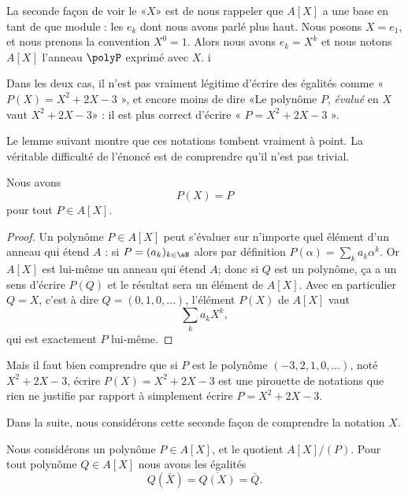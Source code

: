 La seconde façon de voir le «\( X\)» est de nous rappeler que \( A[X]\) a une base en tant de que module : les \( e_k\) dont nous avons parlé plus haut. Nous posons \( X=e_1\), et nous prenons la convention \( X^0=1\). Alors nous avons \( e_k=X^k\) et nous notons \( A[X]\) l'anneau \( \polyP\) exprimé avec \( X\). i

Dans les deux cas, il n'est pas vraiment légitime d'écrire des égalités comme « \( P(X)=X^2+2X-3\) », et encore moins de dire «Le polynôme \( P\), \emph{évalué} en \( X\) vaut \( X^2+2X-3\)»  : il est plus correct d'écrire « \( P=X^2+2X-3\) ».

Le lemme suivant montre que ces notations tombent vraiment à point. La véritable difficulté de l'énoncé est de comprendre qu'il n'est pas trivial.
\begin{lemma}       \label{LEMooGKWQooVOyeDX}
    Nous avons
    \begin{equation}
        P(X)=P
    \end{equation}
    pour tout \( P\in A[X]\).
\end{lemma}

\begin{proof}
    Un polynôme \( P\in A[X]\) peut s'évaluer sur n'importe quel élément d'un anneau qui étend \( A\) : si \( P=(a_k)_{k\in \eN}\) alors par définition \( P(\alpha)=\sum_ka_k\alpha^k\). Or \( A[X]\) est lui-même un anneau qui étend \( A\); donc si \( Q\) est un polynôme, ça a un sens d'écrire \( P(Q)\) et le résultat sera un élément de \( A[X]\). Avec en particulier \( Q=X\), c'est à dire \( Q=(0,1,0,\ldots)\), l'élément \( P(X)\) de \( A[X]\) vaut
    \begin{equation}        \label{EQooABULooFCEasf}
        \sum_ka_kX^k,
    \end{equation}
    qui est exactement \( P\) lui-même.
\end{proof}

Mais il faut bien comprendre que si \( P\) est le polynôme \( (-3,2,1,0,\ldots)\), noté \( X^2+2X-3\), écrire \( P(X)=X^2+2X-3\) est une pirouette de notations que rien ne justifie par rapport à simplement écrire \( P=X^2+2X-3\).

\begin{normaltext}
    Dans la suite, nous considérons cette seconde façon de comprendre la notation \( X\).
\end{normaltext}

\begin{lemma}       \label{LEMooXFMAooMBgIrN}
    Nous considérons un polynôme \( P\in A[X]\), et le quotient \( A[X]/(P)\). Pour tout polynôme \( Q\in A[X]\) nous avons les égalités
    \begin{equation}
        Q(\bar X)=\overline{ Q(X) }=\bar Q.
    \end{equation}
\end{lemma}

